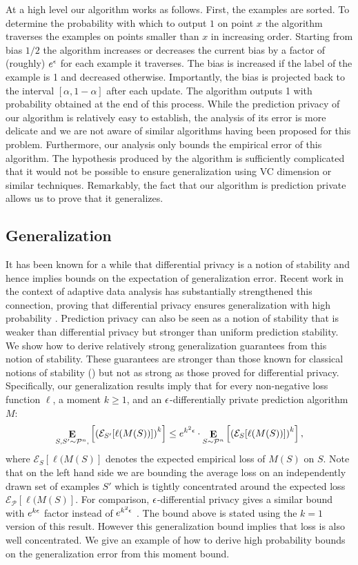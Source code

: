 \documentclass[final,12pt]{colt2018}
\providecommand{\cE}{{\mathcal E}}
\providecommand{\cP}{{\mathcal P}}
\begin{document}
At a high level our algorithm works as follows. First, the examples are sorted. To determine the probability with which to output $1$ on point $x$ the algorithm traverses the examples on points smaller than $x$ in increasing order. Starting from bias $1/2$ the algorithm increases or decreases the current bias by a factor of (roughly) $e^\epsilon$ for each example it traverses. The bias is increased if the label of the example is 1 and decreased otherwise. Importantly, the bias is projected back to the interval $[\alpha,1-\alpha]$ after each update. The algorithm outputs 1 with probability obtained at the end of this process. While the prediction privacy of our algorithm is relatively easy to establish, the analysis of its error is more delicate and we are not aware of similar algorithms having been proposed for this problem. Furthermore, our analysis only bounds the empirical error of this algorithm. The hypothesis produced by the algorithm is sufficiently complicated that it would not be possible to ensure generalization using VC dimension or similar techniques. Remarkably, the fact that our algorithm is prediction private allows us to prove that it generalizes.

\subsection{Generalization}
It has been known for a while that differential privacy is a notion of stability and hence implies bounds on the expectation of generalization error. Recent work in the context of adaptive data analysis has substantially strengthened this connection, proving that differential privacy ensures generalization with high probability \citep{DworkFHPRR14:arxiv,BassilyNSSSU16,FeldmanS17}. Prediction privacy can also be seen as a notion of stability that is weaker than differential privacy but stronger than uniform prediction stability. We show how to derive relatively strong generalization guarantees from this notion of stability. These guarantees are stronger than those known for classical notions of stability (\eg \citep{BousquettE02,ShwartzSSS10}) but not as strong as those proved for differential privacy. Specifically, our generalization results imply that for every non-negative loss function $\ell$, a moment $k \geq 1$, and an $\epsilon$-differentially private prediction algorithm $M$:
$$\E_{S,S'\sim \cP^n,} \lb \lp \cE_{S'}[\ell(M(S))]\rp^k \rb \leq e^{k^2 \eps} \cdot \E_{S\sim \cP^n} \lb \lp\cE_{S}[\ell(M(S))]\rp^k \rb ,$$
where $\cE_{S}[\ell(M(S)]$ denotes the expected empirical loss of $M(S)$ on $S$. Note that on the left hand side we are bounding the average loss on an independently drawn set of examples $S'$ which is tightly concentrated around the expected loss $\cE_{\cP}[\ell(M(S)]$. For comparison, $\epsilon$-differential privacy gives a similar bound with $e^{k\epsilon}$ factor instead of $e^{k^2\epsilon}$ \citep{DworkFHPRR14:arxiv}. The bound above is stated using the $k=1$ version of this result. However this generalization bound implies that loss is also well concentrated. We give an example of how to derive high probability bounds on the generalization error from this moment bound.
\end{document}
